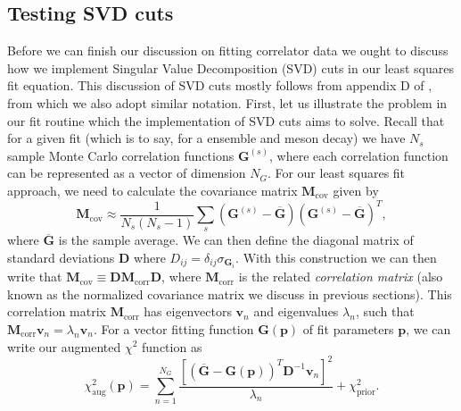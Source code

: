 \subsection{Testing SVD cuts}\label{sec:SVD}
Before we can finish our discussion on fitting correlator data we ought to discuss how we implement Singular Value Decomposition (SVD) cuts in our least squares fit equation.  This discussion of SVD cuts mostly follows from appendix D of \cite{Dowdall_2019}, from which we also adopt similar notation.  First, let us illustrate the problem in our fit routine which the implementation of SVD cuts aims to solve.  Recall that for a given fit (which is to say, for a ensemble and meson decay) we have $N_s$ sample Monte Carlo correlation functions $\textbf{G}^{(s)}$, where each correlation function can be represented as a vector of dimension $N_G$.  For our least squares fit approach, we need to calculate the covariance matrix $\textbf{M}_\mathrm{cov}$ given by
\begin{equation}\label{eq:SVD_Mcov}
    \textbf{M}_\mathrm{cov} \approx \frac{1}{N_s(N_s-1)}\sum_s(\textbf{G}^{(s)}-\overline{\textbf{G}})(\textbf{G}^{(s)}-\overline{\textbf{G}})^T,
\end{equation}
where $\overline{\textbf{G}}$ is the sample average.  We can then define the diagonal matrix of standard deviations $\textbf{D}$ where $D_{ij}=\delta_{ij}\sigma_{\textbf{G}_i}$. With this construction we can then write that $\textbf{M}_\mathrm{cov} \equiv \textbf{D}\textbf{M}_\mathrm{corr}\textbf{D}$, where $\textbf{M}_\mathrm{corr}$ is the related \textit{correlation matrix} (also known as the normalized covariance matrix we discuss in previous sections). This correlation matrix $\textbf{M}_\mathrm{corr}$ has eigenvectors $\textbf{v}_n$ and eigenvalues $\lambda_n$, such that $\textbf{M}_\mathrm{corr}\textbf{v}_n = \lambda_n\textbf{v}_n$.  For a vector fitting function $\textbf{G}(\textbf{p})$ of fit parameters $\textbf{p}$, we can write our augmented $\chi^2$ function as
\begin{equation}\label{eq:SVD_chi2}
    \chi^2_\mathrm{aug}(\textbf{p})=\sum_{n=1}^{N_G} \frac{\left[\left(\overline{\textbf{G}}-\textbf{G}(\textbf{p})\right)^T\textbf{D}^{-1}\textbf{v}_n\right]^2}{\lambda_n} + \chi^2_\mathrm{prior}.
\end{equation}


